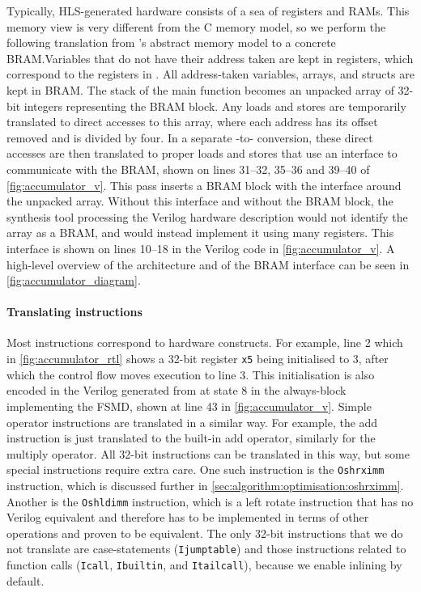 Typically, HLS-generated hardware consists of a sea of registers and RAMs.  This
memory view is very different from the C memory model, so we perform the
following translation from \compcert{}'s abstract memory model to a concrete
\gls{BRAM}.\@ Variables that do not have their address taken are kept in
registers, which correspond to the registers in \rtl{}.  All address-taken
variables, arrays, and structs are kept in \gls{BRAM}.  The stack of the main
function becomes an unpacked array of 32-bit integers representing the
\gls{BRAM} block.  Any loads and stores are temporarily translated to direct
accesses to this array, where each address has its offset removed and is divided
by four.  In a separate \htl{}-to-\htl{} conversion, these direct accesses are
then translated to proper loads and stores that use an interface to communicate
with the \gls{BRAM}, shown on lines 31--32, 35--36 and 39--40 of
\cref{fig:accumulator_v}.  This pass inserts a \gls{BRAM} block with the
interface around the unpacked array.  Without this interface and without the
\gls{BRAM} block, the synthesis tool processing the Verilog hardware description
would not identify the array as a \gls{BRAM}, and would instead implement it
using many registers.  This interface is shown on lines 10--18 in the Verilog
code in \cref{fig:accumulator_v}.  A high-level overview of the architecture and
of the \gls{BRAM} interface can be seen in \cref{fig:accumulator_diagram}.

\paragraph{Translating instructions}

Most \rtl{} instructions correspond to hardware constructs.  For example, line 2
which in \cref{fig:accumulator_rtl} shows a 32-bit register \texttt{x5} being
initialised to 3, after which the control flow moves execution to line 3. This
initialisation is also encoded in the Verilog generated from \htl{} at state 8
in the always-block implementing the \gls{FSMD}, shown at line 43 in
\cref{fig:accumulator_v}.  Simple operator instructions are translated in a
similar way.  For example, the add instruction is just translated to the
built-in add operator, similarly for the multiply operator.  All 32-bit
instructions can be translated in this way, but some special instructions
require extra care. One such instruction is the \texttt{Oshrximm} instruction,
which is discussed further in
\cref{sec:algorithm:optimisation:oshrximm}. Another is the \texttt{Oshldimm}
instruction, which is a left rotate instruction that has no Verilog equivalent
and therefore has to be implemented in terms of other operations and proven to
be equivalent.  The only 32-bit instructions that we do not translate are
case-statements (\texttt{Ijumptable}) and those instructions related to function
calls (\texttt{Icall}, \texttt{Ibuiltin}, and \texttt{Itailcall}), because we
enable inlining by default.

